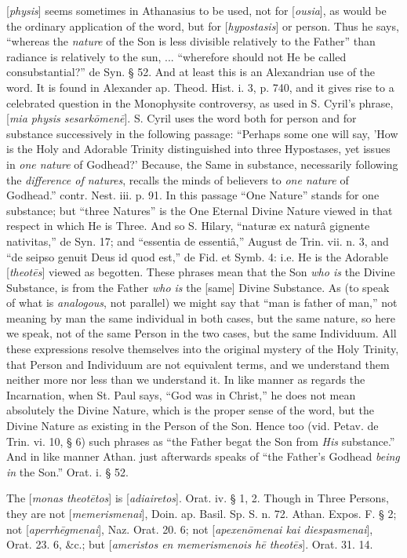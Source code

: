 [\emph{physis}] seems sometimes in Athanasius to
be used, not for [\emph{ousia}], as would be the ordinary application
of the word, but for [\emph{hypostasis}] or person. Thus he says, ``whereas
the \emph{nature} of the Son is less divisible relatively to the
Father'' than radiance is relatively to the sun, ... ``wherefore should
not He be called consubstantial?'' de Syn. § 52. And at least this is
an Alexandrian use of the word. It is found in Alexander ap. Theod.
Hist. i. 3, p. 740, and it gives rise to a celebrated question in the
Monophysite controversy, as used in S. Cyril's phrase, [\emph{mia physis
sesark\={o}men\={e}}]. S. Cyril uses the word both for person
and for substance successively in the following passage: ``Perhaps some
one will say, 'How is the Holy and Adorable Trinity distinguished into
three Hypostases, yet issues in \emph{one nature} of Godhead?'
Because, the Same in substance, necessarily following the \emph{difference
of natures}, recalls the minds of believers to \emph{one nature} of
Godhead.'' contr. Nest. iii. p. 91. In this passage ``One Nature'' stands
for one substance; but ``three Natures'' is the One Eternal Divine
Nature viewed in that respect in which He is Three. And so S. Hilary, ``naturæ
ex naturâ gignente nativitas,'' de Syn. 17; and ``essentia de essentiâ,''
August de Trin. vii. n. 3, and ``de seipso genuit Deus id quod est,'' de
Fid. et Symb. 4: i.e. He is the Adorable [\emph{theot\={e}s}]
viewed as begotten. These phrases mean that the Son \emph{who is}
the Divine Substance, is from the Father \emph{who is} the [same]
Divine Substance. As (to speak of what is \emph{analogous}, not
parallel) we might say that ``man is father of man,'' not meaning by man
the same individual in both cases, but the same nature, so here we
speak, not of the same Person in the two cases, but the same
Individuum. All these expressions resolve themselves into the original
mystery of the Holy Trinity, that Person and Individuum are not
equivalent terms, and we understand them neither more nor less than we
understand it. In like manner as regards the Incarnation, when St.
Paul says, ``God was in Christ,'' he does not mean absolutely the Divine
Nature, which is the proper sense of the word, but the Divine Nature
as existing in the Person of the Son. Hence too (vid. Petav. de Trin.
vi. 10, § 6) such phrases as ``the Father begat the Son from \emph{His}
substance.'' And in like manner Athan. just afterwards speaks of ``the
Father's Godhead \emph{being in} the Son.'' Orat. i. § 52.

The [\emph{monas theot\={e}tos}] is [\emph{adiairetos}].
Orat. iv. § 1, 2. Though in Three Persons, they are not [\emph{memerismenai}],
Doin. ap. Basil. Sp. S. n. 72. Athan. Expos. F. § 2; not [\emph{aperrh\={e}gmenai}],
Naz. Orat. 20. 6; not [\emph{apexen\={o}menai kai diespasmenai}],
Orat. 23. 6, \&c.; but [\emph{ameristos en memerismenois h\={e}
theot\={e}s}]. Orat. 31. 14.

